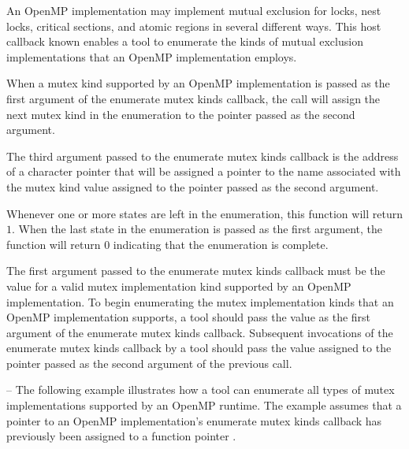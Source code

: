 \descr
An OpenMP implementation may implement mutual exclusion for locks,
nest locks, critical sections, and atomic regions in several different
ways.  This host callback known enables a tool to enumerate the 
kinds of mutual exclusion implementations that an OpenMP implementation
employs.

\begin{comment}
For that reason, a user program can provide hints
to help the runtime system to select appropriate implementations.
When a lock or nest lock is initialized, the \code{ompt\_event\_init\_lock}
callback receives the argument \code{kind}---a small integer that
indicates the lock implementation chosen by the OpenMP runtime.
Similarly, the \code{ompt\_event\_mutex\_acquire} callback receives
the argument \code{kind} to indicate the implementation of a lock,
critical section, atomic region, or ordered section. 
\end{comment}
 
When a mutex kind supported by an OpenMP implementation is passed
as the first argument of the enumerate mutex kinds callback,
the call will assign the next mutex kind in the enumeration to
the pointer passed as the second argument.

The third argument passed to the enumerate mutex kinds callback
is the address of a character pointer that will be assigned a pointer
to the name associated with the mutex kind value assigned to the pointer
passed as the second argument.

Whenever one or more states are left in the enumeration, 
this function will return $1$.
When the last state in the enumeration is passed 
as the first argument, the function will return $0$ 
indicating that the enumeration is complete.

\constraints
The first argument passed to the enumerate mutex kinds callback must be
the value for a valid mutex implementation kind supported
by an OpenMP implementation.  To begin enumerating the mutex
implementation kinds that an OpenMP implementation supports, a tool
should pass the value  as the first
argument of the enumerate mutex kinds callback.  Subsequent invocations
of the enumerate mutex kinds callback by a tool should pass the
value assigned to the pointer passed as the second argument of the
previous call.

\notestart
\noteheader -- The following example illustrates how a tool can 
enumerate all types of mutex implementations supported by an OpenMP runtime.
The example assumes that a pointer to an OpenMP implementation's enumerate
mutex kinds callback has previously been assigned to a function pointer
.

